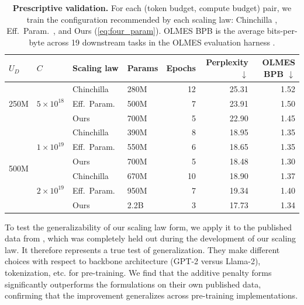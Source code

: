 \begin{table}[t]
    \centering
    \caption{\textbf{Prescriptive validation.} For each (token budget, compute budget) pair, we train the configuration recommended by each scaling law: Chinchilla \citep{hoffmann2022training}, Eff.\ Param.\ \citep{muennighoff2023scaling}, and Ours (\autoref{eq:four_param}). OLMES BPB is the average bits-per-byte across 19 downstream tasks in the OLMES evaluation harness \citep{gu2025olmes}.}
    \label{tab:held_out_validation}
    \begin{tabular}{llllrrr}
        \toprule
        $U_D$ & $C$ & Scaling law & Params & Epochs & Perplexity $\downarrow$ & OLMES BPB $\downarrow$ \\
        \midrule
        \multirow{3}{*}{250M}
        & \multirow{3}{*}{$5 \times 10^{18}$}
        & Chinchilla & 280M & 12 & 25.31 & 1.52 \\
        & & Eff.\ Param.\ & 500M & 7 & 23.91 & 1.50 \\
        & & Ours & 700M & 5 & {22.90} & {1.45} \\
        \midrule
        \multirow{6}{*}{500M}
        & \multirow{3}{*}{$1 \times 10^{19}$}
        & Chinchilla & 390M & 8 & 18.95 & 1.35 \\
        & & Eff.\ Param.\ & 550M & 6 & 18.65 & 1.35 \\
        & & Ours & 700M & 5 & {18.48} & {1.30} \\
        \cmidrule(l){2-7}
        & \multirow{3}{*}{$2 \times 10^{19}$}
        & Chinchilla & 670M & 10 & 18.90 & 1.37 \\
        & & Eff.\ Param.\ & 950M & 7 & 19.34 & 1.40 \\
        & & Ours & 2.2B & 3 & {17.73} & {1.34} \\
        \bottomrule
    \end{tabular}
    \vspace{-1em}
\end{table}

 To test the generalizability of our scaling law form, we apply it to the published data from \citet{muennighoff2023scaling}, which was completely held out during the development of our scaling law. It therefore represents a true test of generalization. They make different choices with respect to backbone architecture (GPT-2 versus Llama-2), tokenization, etc. for pre-training. We find that the additive penalty forms significantly  outperforms the \citet{muennighoff2023scaling} formulations on their own published data, confirming that the improvement generalizes across pre-training implementations.
